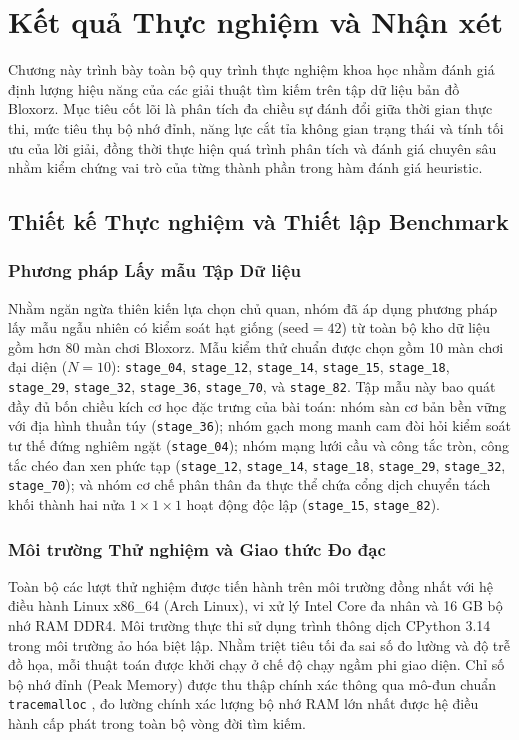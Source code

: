 \section{Kết quả Thực nghiệm và Nhận xét}
\label{sec:experiments}

Chương này trình bày toàn bộ quy trình thực nghiệm khoa học nhằm đánh
giá định lượng hiệu năng của các giải thuật tìm kiếm trên tập dữ liệu
bản đồ Bloxorz. Mục tiêu cốt lõi là phân tích đa chiều sự đánh đổi giữa
thời gian thực thi, mức tiêu thụ bộ nhớ đỉnh, năng lực cắt tỉa không gian
trạng thái và tính tối ưu của lời giải, đồng thời thực hiện quá trình phân tích
và đánh giá chuyên sâu nhằm kiểm chứng vai trò của từng
thành phần trong hàm đánh giá heuristic.

\subsection{Thiết kế Thực nghiệm và Thiết lập Benchmark}
\label{subsec:exp_setup}

\subsubsection{Phương pháp Lấy mẫu Tập Dữ liệu}
Nhằm ngăn ngừa thiên kiến lựa chọn chủ quan, nhóm đã áp dụng
phương pháp lấy mẫu ngẫu nhiên có kiểm soát hạt giống ($\text{seed} = 42$)
từ toàn bộ kho dữ liệu gồm hơn 80 màn chơi Bloxorz. Mẫu kiểm thử chuẩn
được chọn gồm 10 màn chơi đại diện ($N=10$): \texttt{stage\_04},
\texttt{stage\_12}, \texttt{stage\_14}, \texttt{stage\_15},
\texttt{stage\_18}, \texttt{stage\_29}, \texttt{stage\_32},
\texttt{stage\_36}, \texttt{stage\_70}, và \texttt{stage\_82}. Tập mẫu
này bao quát đầy đủ bốn chiều kích cơ học đặc trưng của bài toán: nhóm
sàn cơ bản bền vững với địa hình thuần túy (\texttt{stage\_36}); nhóm gạch
mong manh cam đòi hỏi kiểm soát tư thế đứng nghiêm ngặt (\texttt{stage\_04});
nhóm mạng lưới cầu và công tắc tròn, công tắc chéo đan xen phức tạp
(\texttt{stage\_12}, \texttt{stage\_14}, \texttt{stage\_18},
\texttt{stage\_29}, \texttt{stage\_32}, \texttt{stage\_70}); và nhóm cơ chế
phân thân đa thực thể chứa cổng dịch chuyển tách khối thành hai nửa
$1 \times 1 \times 1$ hoạt động độc lập (\texttt{stage\_15},
\texttt{stage\_82}).

\subsubsection{Môi trường Thử nghiệm và Giao thức Đo đạc}
Toàn bộ các lượt thử nghiệm được tiến hành trên môi trường đồng nhất
với hệ điều hành Linux x86\_64 (Arch Linux), vi xử lý Intel Core đa nhân
và 16 GB bộ nhớ RAM DDR4. Môi trường thực thi sử dụng trình thông dịch
CPython 3.14 trong môi trường ảo hóa biệt lập. Nhằm triệt tiêu tối đa
sai số đo lường và độ trễ đồ họa, mỗi thuật toán được khởi chạy ở chế độ
chạy ngầm phi giao diện. Chỉ số bộ nhớ đỉnh (Peak Memory)
được thu thập chính xác thông qua mô-đun chuẩn \texttt{tracemalloc}
\cite{python2024tracemalloc}, đo lường chính xác lượng bộ nhớ RAM lớn nhất
được hệ điều hành cấp phát trong toàn bộ vòng đời tìm kiếm.

